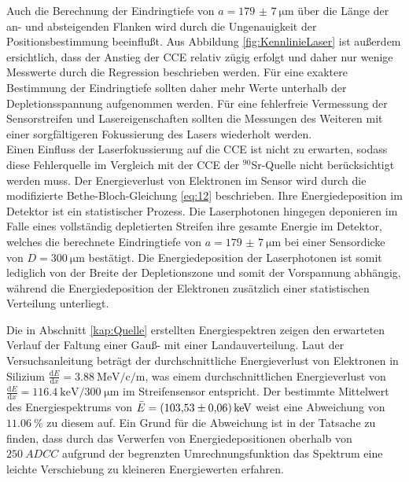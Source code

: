 Auch die Berechnung der Eindringtiefe von $a= \SI{179(7)}{\micro\metre}$ über die Länge der an- und absteigenden Flanken wird durch die Ungenauigkeit der Positionsbestimmung beeinflußt.
Aus Abbildung \ref{fig:KennlinieLaser} ist außerdem ersichtlich, dass der Anstieg der CCE relativ zügig erfolgt und daher nur wenige Messwerte durch die Regression beschrieben werden. Für eine exaktere Bestimmung der Eindringtiefe sollten daher mehr Werte unterhalb der Depletionsspannung aufgenommen werden.
Für eine fehlerfreie Vermessung der Sensorstreifen und Lasereigenschaften sollten die Messungen des Weiteren mit einer sorgfältigeren Fokussierung des Lasers wiederholt werden.\\

Einen Einfluss der Laserfokussierung auf die CCE ist nicht zu erwarten, sodass diese Fehlerquelle im Vergleich mit der CCE der $^{90}$Sr-Quelle nicht berücksichtigt werden muss.
Der Energieverlust von Elektronen im Sensor wird durch die modifizierte Bethe-Bloch-Gleichung \ref{eq:12} beschrieben. Ihre Energiedeposition im Detektor ist ein statistischer Prozess. Die Laserphotonen hingegen deponieren im Falle eines vollständig depletierten Streifen ihre gesamte Energie im Detektor, welches die berechnete Eindringtiefe von $a= \SI{179(7)}{\micro\metre}$ bei einer Sensordicke von $D= \SI{300}{\micro\metre}$ bestätigt. Die Energiedeposition der Laserphotonen ist somit lediglich von der Breite der Depletionszone und somit der Vorspannung abhängig, während die Energiedeposition der Elektronen zusätzlich einer statistischen Verteilung unterliegt.

Die in Abschnitt \ref{kap:Quelle} erstellten Energiespektren zeigen den erwarteten Verlauf der Faltung einer Gauß- mit einer Landauverteilung. Laut der Versuchsanleitung \cite{anleitung} beträgt der durchschnittliche Energieverlust von Elektronen in Silizium $\frac{\mathrm{d}E}{\mathrm{d}x} = \SI{3.88}{\mega\electronvolt\per\centi \per \metre}$, was einem durchschnittlichen Energieverlust von $\frac{\mathrm{d}E}{\mathrm{d}x} = \SI{116.4}{\kilo\electronvolt\per 300\; \micro \metre}$ im Streifensensor entspricht. Der bestimmte Mittelwert des Energiespektrums von $\bar{E} = \SI{103.53 \pm 0.06}{\kilo\electronvolt}$ weist eine Abweichung von $\SI{11.06}{\%}$ zu diesem auf. Ein Grund für die Abweichung ist in der Tatsache zu finden, dass durch das Verwerfen von Energiedepositionen oberhalb von $\SI{250}{ADCC}$ aufgrund der begrenzten Umrechnungsfunktion das Spektrum eine leichte Verschiebung zu kleineren Energiewerten erfahren.
